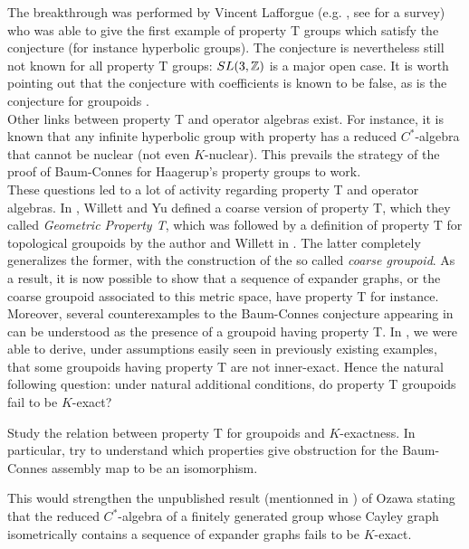 The breakthrough was performed by Vincent Lafforgue (e.g. \cite{lafforgue2002k}, see \cite{skandalis2002progres} for a survey) who was able to give the first example of property T groups which satisfy the conjecture (for instance hyperbolic groups). The conjecture is nevertheless still not known for all property T groups: $SL(3, \mathbb{Z})$ is a major open case. It is worth pointing out that the conjecture with coefficients is known to be false, as is the conjecture for groupoids \cite{HigsonLaffSk}.\\

Other links between property T and operator algebras exist. For instance, it is known \cite{skandalis1988notion} that any infinite hyperbolic group with property has a reduced $C^*$-algebra that cannot be nuclear (not even $K$-nuclear). This prevails the strategy of the proof of Baum-Connes for Haagerup's property groups \cite{HigsonKasparov} to work. \\

These questions led to a lot of activity regarding property T and operator algebras. In \cite{WillettYu}, Willett and Yu defined a coarse version of property T, which they called \textit{Geometric Property T}, which was followed by a definition of property T for topological groupoids by the author and Willett in \cite{DellWillett}. The latter completely generalizes the former, with the construction of the so called \textit{coarse groupoid}. As a result, it is now possible to show that a sequence of expander graphs, or the coarse groupoid associated to this metric space, have property T for instance. Moreover, several counterexamples to the Baum-Connes conjecture appearing in \cite{HigsonLaffSk} can be understood as the presence of a groupoid having property T. In \cite{DellWillett}, we were able to derive, under assumptions easily seen in previously existing examples, that some groupoids having property T are not inner-exact. Hence the natural following question: under natural additional conditions, do property T groupoids fail to be $K$-exact? 

\begin{project} Study the relation between property T for groupoids and $K$-exactness. In particular, try to understand which properties give obstruction for the Baum-Connes assembly map to be an isomorphism.
\end{project}

This would strengthen the unpublished result (mentionned in \cite{HigsonLaffSk}) of Ozawa stating that the reduced $C^*$-algebra of a finitely generated group whose Cayley graph isometrically contains a sequence of expander graphs fails to be $K$-exact.

